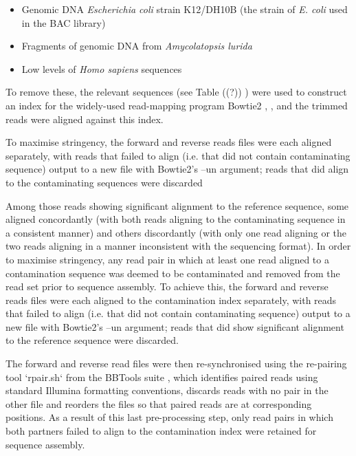 \begin{itemize}
\item Genomic DNA \textit{Escherichia coli} strain K12/DH10B (the strain of \textit{E. coli} used in the BAC library) %
\item Fragments of genomic DNA from \textit{Amycolatopsis lurida} %
\item Low levels of \textit{Homo sapiens} sequences
\end{itemize}

To remove these, the relevant sequences (see Table ((?)) ) were used to construct an index for the widely-used read-mapping program Bowtie2 \citep{langmead2012bowtie2},
, and the trimmed reads were aligned against this index. 


To maximise stringency, the forward and reverse reads files were each aligned separately, with reads that failed to align (i.e. that did not contain contaminating sequence) output to a new file with Bowtie2's --un argument; reads that did align to the contaminating sequences were discarded %

Among those reads showing significant alignment to the reference sequence, some aligned concordantly (with both reads aligning to the contaminating sequence in a consistent manner) and others discordantly (with only one read aligning or the two reads aligning in a manner inconsistent with the sequencing format). In order to maximise stringency, any read pair in which at least one read aligned to a contamination sequence was deemed to be contaminated and removed from the read set prior to sequence assembly. To achieve this, the forward and reverse reads files were each aligned to the contamination index separately, with reads that failed to align (i.e. that did not contain contaminating sequence) output to a new file with Bowtie2's --un argument; reads that did show significant alignment to the reference sequence were discarded. %

The forward and reverse read files were then re-synchronised using the re-pairing tool `rpair.sh` from the BBTools suite %
, which identifies paired reads using standard Illumina formatting conventions, discards reads with no pair in the other file and reorders the files so that paired reads are at corresponding positions. As a result of this last pre-processing step, only read pairs in which both partners failed to align to the contamination index were retained for sequence assembly.

